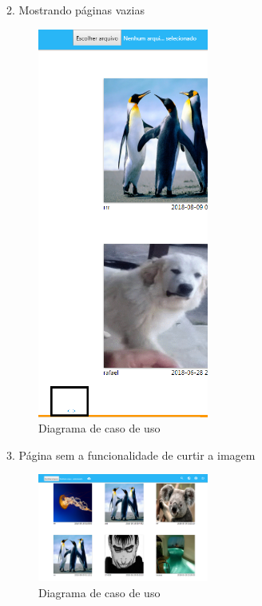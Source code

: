 \pagebreak

2. Mostrando páginas vazias
\begin{figure}[ht]
	\centering
	\includegraphics[width=0.5\textwidth]{./imagens/paginas.png}
	\caption{Diagrama de caso de uso}
	\label{fig:casoDeUso}
\end{figure}

\pagebreak

3. Página sem a funcionalidade de curtir a imagem
\begin{figure}[ht]
	\centering
	\includegraphics[width=0.5\textwidth]{./imagens/botao_curtir.png}
	\caption{Diagrama de caso de uso}
	\label{fig:casoDeUso}
\end{figure}

\pagebreak

